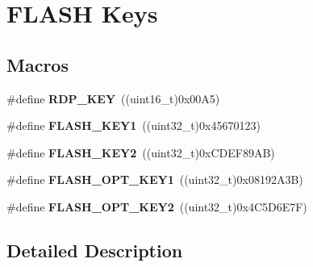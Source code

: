 \hypertarget{group___f_l_a_s_h___keys}{}\section{F\+L\+A\+SH Keys}
\label{group___f_l_a_s_h___keys}
\subsection*{Macros}
\begin{DoxyCompactItemize}
\item 
\#define {\bfseries R\+D\+P\+\_\+\+K\+EY}~((uint16\+\_\+t)0x00\+A5)\hypertarget{group___f_l_a_s_h___keys_gae497135e5528d69274bf8daf7f077f23}{}\label{group___f_l_a_s_h___keys_gae497135e5528d69274bf8daf7f077f23}

\item 
\#define {\bfseries F\+L\+A\+S\+H\+\_\+\+K\+E\+Y1}~((uint32\+\_\+t)0x45670123)\hypertarget{group___f_l_a_s_h___keys_gafd77e7bf91765d891ce63e2f0084b019}{}\label{group___f_l_a_s_h___keys_gafd77e7bf91765d891ce63e2f0084b019}

\item 
\#define {\bfseries F\+L\+A\+S\+H\+\_\+\+K\+E\+Y2}~((uint32\+\_\+t)0x\+C\+D\+E\+F89\+A\+B)\hypertarget{group___f_l_a_s_h___keys_gaee83d0f557e158da52f4a205db6b60a7}{}\label{group___f_l_a_s_h___keys_gaee83d0f557e158da52f4a205db6b60a7}

\item 
\#define {\bfseries F\+L\+A\+S\+H\+\_\+\+O\+P\+T\+\_\+\+K\+E\+Y1}~((uint32\+\_\+t)0x08192\+A3\+B)\hypertarget{group___f_l_a_s_h___keys_gacebe54ff9ff12abcf0e4d3e697b2f116}{}\label{group___f_l_a_s_h___keys_gacebe54ff9ff12abcf0e4d3e697b2f116}

\item 
\#define {\bfseries F\+L\+A\+S\+H\+\_\+\+O\+P\+T\+\_\+\+K\+E\+Y2}~((uint32\+\_\+t)0x4\+C5\+D6\+E7\+F)\hypertarget{group___f_l_a_s_h___keys_ga636d46db38e376f0483eed4b7346697c}{}\label{group___f_l_a_s_h___keys_ga636d46db38e376f0483eed4b7346697c}

\end{DoxyCompactItemize}


\subsection{Detailed Description}
